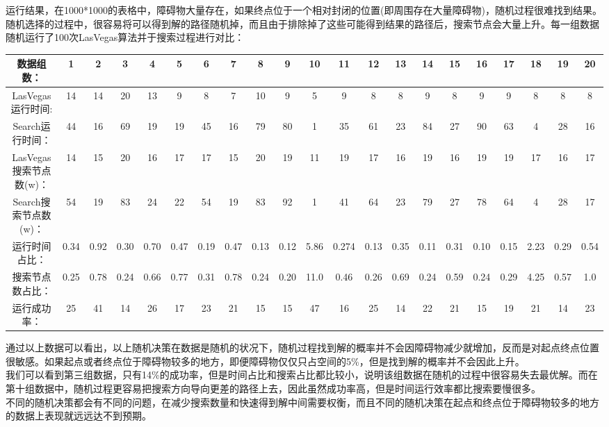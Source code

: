 \documentclass[paper=a4,margin=0.5cm]{scrartcl} %
\begin{document}
\indent 运行结果，在1000*1000的表格中，障碍物大量存在，如果终点位于一个相对封闭的位置(即周围存在大量障碍物)，随机过程很难找到结果。随机选择的过程中，很容易将可以得到解的路径随机掉，而且由于排除掉了这些可能得到结果的路径后，搜索节点会大量上升。每一组数据随机运行了100次LasVegas算法并于搜索过程进行对比：\\
\begin{tabular}{ccccccccccccccccccccc}
	
	\hline 
	数据组数：&1 &2 &3 &4 &5 &6 &7 &8 &9 &10 &11 &12 &13 &14 &15 &16 &17 &18 &19 &20\\
	\hline 
	LasVegas运行时间: & 14 & 14 & 20 & 13 & 9 & 8 & 7 & 10 & 9 & 5 & 9 & 8 & 8 & 9 & 8 & 9 & 9 & 8 & 8 & 8\\ 
	\hline 
	Search运行时间：& 44 & 16 & 69 & 19 & 19 & 45 & 16 & 79 & 80 & 1 & 35 & 61 & 23 & 84 & 27 & 90 & 63 & 4 & 28 & 16 \\ 
	\hline 
	LasVegas搜索节点数(w)：& 14 & 15 & 20 & 16 & 17 & 17 & 15 & 20 & 19 & 11 & 19 & 17 & 16 & 19 & 16 & 19 & 19 & 17 & 16 & 17\\ 
	\hline 
	Search搜索节点数(w)：& 54 & 19 & 83 & 24 & 22 & 54 & 19 & 83 & 92 & 1 & 41 & 64 & 23 & 79 & 27 & 78 & 64 & 4 & 28 & 17\\ 
	\hline 
	运行时间占比：& 0.34 & 0.92 & 0.30 & 0.70 & 0.47 & 0.19& 0.47 & 0.13 & 0.12 & 5.86 & 0.274 & 0.13 & 0.35 & 0.11 & 0.31 & 0.10 & 0.15 & 2.23 & 0.29 & 0.54\\ 
	\hline 
	搜索节点数占比：& 0.25 & 0.78 & 0.24 & 0.66 & 0.77& 0.31 & 0.78 & 0.24 & 0.20 & 11.0 & 0.46 & 0.26 & 0.69 & 0.24 & 0.59 & 0.24 & 0.29 & 4.25 & 0.57 & 1.0\\ 
	\hline 
	运行成功率：& 25 & 41 & 14 & 26 & 17 & 23 & 21 & 15 & 15 & 47 & 16 & 25 & 14 & 22 & 21 & 15 & 19 & 21 & 14 & 23\\ 
	\hline 
\end{tabular}

\indent 通过以上数据可以看出，以上随机决策在数据是随机的状况下，随机过程找到解的概率并不会因障碍物减少就增加，反而是对起点终点位置很敏感。如果起点或者终点位于障碍物较多的地方，即便障碍物仅仅只占空间的5\%，但是找到解的概率并不会因此上升。\\
\indent 我们可以看到第三组数据，只有14\%的成功率，但是时间占比和搜索占比都比较小，说明该组数据在随机的过程中很容易失去最优解。而在第十组数据中，随机过程更容易把搜索方向导向更差的路径上去，因此虽然成功率高，但是时间运行效率都比搜索要慢很多。\\
\indent 不同的随机决策都会有不同的问题，在减少搜索数量和快速得到解中间需要权衡，而且不同的随机决策在起点和终点位于障碍物较多的地方的数据上表现就远远达不到预期。\\
\end{document}
